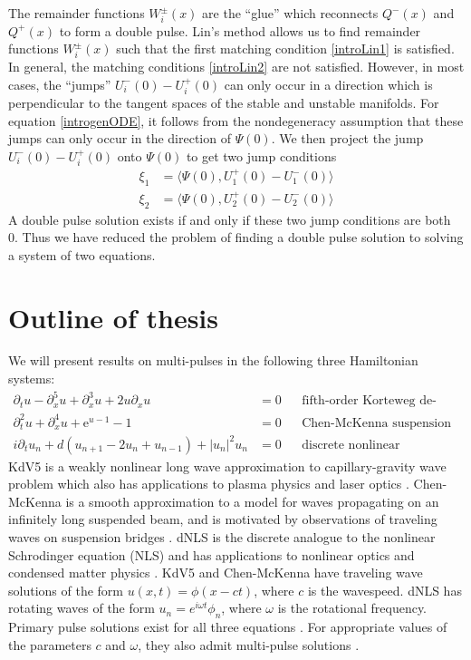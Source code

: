 \documentclass[thesis2.tex]{subfiles}
\begin{document}
The remainder functions $W_i^\pm(x)$ are the ``glue'' which reconnects $Q^-(x)$ and $Q^+(x)$ to form a double pulse. Lin's method allows us to find remainder functions $W_i^\pm(x)$ such that the first matching condition \cref{introLin1} is satisfied. In general, the matching conditions \cref{introLin2} are not satisfied. However, in most cases, the ``jumps'' $U_i^-(0) - U_i^+(0)$ can only occur in a direction which is perpendicular to the tangent spaces of the stable and unstable manifolds. For equation \cref{introgenODE}, it follows from the nondegeneracy assumption that these jumps can only occur in the direction of $\Psi(0)$. We then project the jump $U_i^-(0) - U_i^+(0)$ onto $\Psi(0)$ to get two jump conditions
\begin{equation}\label{introLinJump}
\begin{aligned}
\xi_1 &= \langle \Psi(0), U_1^+(0) - U_1^-(0) \rangle \\
\xi_2 &= \langle \Psi(0), U_2^+(0) - U_2^-(0) \rangle
\end{aligned}
\end{equation} 
A double pulse solution exists if and only if these two jump conditions are both 0. Thus we have reduced the problem of finding a double pulse solution to solving a system of two equations.

\section{Outline of thesis}

We will present results on multi-pulses in the following three Hamiltonian systems:
\begin{align*}
\partial_t u - \partial_x^5 u + \partial_x^3 u + 2 u \partial_x u &= 0 && \text{fifth-order Korteweg de-Vries equation (KdV5)} \\
\partial_t^2 u + \partial_x^4 u + \mathrm{e}^{u-1} - 1 &= 0 &&\text{Chen-McKenna suspension bridge equation} \\
i\partial_t u_n + d(u_{n+1} - 2 u_n + u_{n-1}) + |u_n|^2 u_n &= 0 &&\text{discrete nonlinear Schrodinger equation (dNLS)}
\end{align*}
KdV5 is a weakly nonlinear long wave approximation to capillary-gravity wave problem which also has applications to plasma physics and laser optics \cite{Pelinovsky2007}. Chen-McKenna is a smooth approximation to a model for waves propagating on an infinitely long suspended beam, and is motivated by observations of traveling waves on suspension bridges \cite{McKenna1990,Chen1997}. dNLS is the discrete analogue to the nonlinear Schrodinger equation (NLS) and has applications to nonlinear optics and condensed matter physics \cite{Kevrekidis2009}. KdV5 and Chen-McKenna have traveling wave solutions of the form $u(x, t) = \phi(x - ct)$, where $c$ is the wavespeed. dNLS has rotating waves of the form $u_n = e^{i\omega t}\phi_n$, where $\omega$ is the rotational frequency. Primary pulse solutions exist for all three equations \cite{Pelinovsky2007,Smets2002,Berg2018,Kevrekidis2009}. For appropriate values of the parameters $c$ and $\omega$, they also admit multi-pulse solutions \cite{Buffoni1996,SandstedeStrut,Kevrekidis2009}.
\end{document}
